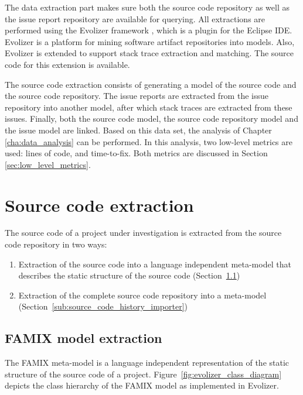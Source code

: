 The data extraction part makes sure both the source code repository as well as the issue report repository are available for querying. All extractions are performed using the Evolizer framework \cite{Gall2009}, which is a plugin for the Eclipse IDE. Evolizer is a platform for mining software artifact repositories into models. Also, Evolizer is extended to support stack trace extraction and matching. The source code for this extension is available.

The source code extraction consists of generating a model of the source code and the source code repository. The issue reports are extracted from the issue repository into another model, after which stack traces are extracted from these issues. Finally, both the source code model, the source code repository model and the issue model are linked. Based on this data set, the analysis of Chapter \ref{cha:data_analysis} can be performed. In this analysis, two low-level metrics are used: lines of code, and time-to-fix. Both metrics are discussed in Section \ref{sec:low_level_metrics}.

\section{Source code extraction} %
\label{sec:source_code_extraction}
The source code of a project under investigation is extracted from the source code repository in two ways:

\begin{enumerate}
	\item Extraction of the source code into a language independent meta-model that describes the static structure of the source code (Section~\ref{sub:famix_model_extraction})
	\item Extraction of the complete source code repository into a meta-model (Section~\ref{sub:source_code_history_importer})
\end{enumerate} 

\subsection{FAMIX model extraction} %
\label{sub:famix_model_extraction}
The FAMIX meta-model \cite{Tichelaar2000,Tichelaar2001} is a language independent representation of the static structure of the source code of a project. Figure~\ref{fig:evolizer_class_diagram} depicts the class hierarchy of the FAMIX model as implemented in Evolizer. 

